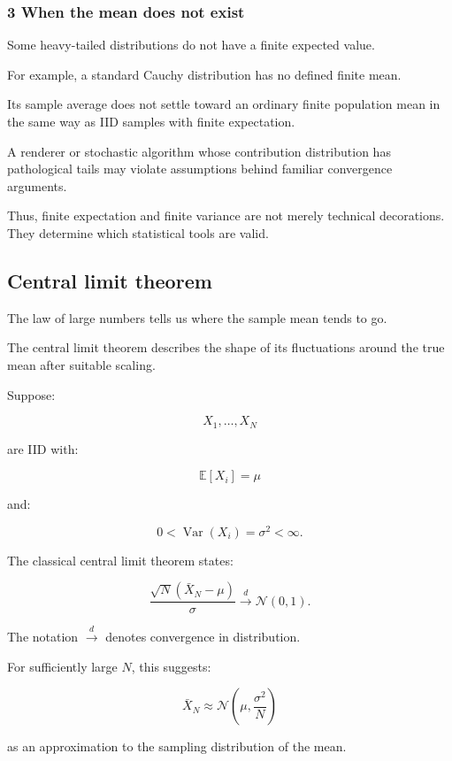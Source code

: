 \subsubsection{3 When the mean does not exist}\label{02-foundations-ii-ch030-when-the-mean-does-not-exist}

Some heavy-tailed distributions do not have a finite expected value.

For example, a standard Cauchy distribution has no defined finite mean.

Its sample average does not settle toward an ordinary finite population mean in the same way as IID samples with finite expectation.

A renderer or stochastic algorithm whose contribution distribution has pathological tails may violate assumptions behind familiar convergence arguments.

Thus, finite expectation and finite variance are not merely technical decorations. They determine which statistical tools are valid.

\subsection{Central limit theorem}\label{02-foundations-ii-ch030-central-limit-theorem}

The law of large numbers tells us where the sample mean tends to go.

The central limit theorem describes the shape of its fluctuations around the true mean after suitable scaling.

Suppose:

\[
 X_1,\ldots,X_N
\]

are IID with:

\[
 \mathbb E[X_i]=\mu
\]

and:

\[
 0<\operatorname{Var}(X_i)=\sigma^2<\infty.
\]

The classical central limit theorem states:

\[
 \boxed{ \frac{\sqrt N(\bar X_N-\mu)}{\sigma} \xrightarrow{d}\mathcal N(0,1) }.
\]

The notation \(\xrightarrow{d}\) denotes convergence in distribution.

For sufficiently large \(N\), this suggests:

\[
 \boxed{ \bar X_N \approx \mathcal N\left( \mu,\frac{\sigma^2}{N} \right) }
\]

as an approximation to the sampling distribution of the mean.

